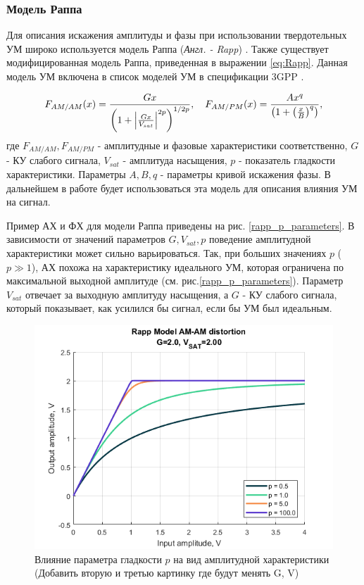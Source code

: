 \subsubsection{Модель Раппа}
Для описания искажения амплитуды и фазы при использовании твердотельных УМ
широко используется модель Раппа (\textit{Англ. - Rapp}) \cite{Rapp1991}.
Также существует модифицированная модель Раппа, приведенная в выражении
\ref{eq:Rapp}. Данная модель УМ включена в список моделей УМ в спецификации
3GPP \cite{3gpp.38.803}.

\begin{equation}
    F_{AM/AM}(x) = \frac{G x}{\left( 1 + \abs{\frac{Gx}{V_{sat}}}^{2p}\right)^{1/2p}},
    \quad 
    F_{AM/PM}(x) = \frac{Ax^q}{\left(1+\left(\frac{x}{B}\right)^q\right)},
    \label{eq:Rapp}
\end{equation}
где $F_{AM/AM}, F_{AM/PM}$ - амплитудные и фазовые характеристики
соответственно, $G$ - КУ слабого сигнала, $V_{sat}$ - амплитуда насыщения,
$p$ - показатель гладкости характеристики. Параметры $A,B,q$ - параметры
кривой искажения фазы. В дальнейшем в работе будет использоваться эта
модель для описания влияния УМ на сигнал.

Пример АХ и ФХ для модели Раппа приведены на  рис. \ref{rapp_p_parameters}.
В зависимости от значений параметров $G, V_{sat}, p$ поведение амплитудной
характеристики может сильно варьироваться. Так, при больших значениях $p$
($p\gg 1$), АХ похожа на характеристику идеального УМ, которая ограничена
по максимальной выходной амплитуде (см. рис.\ref{rapp_p_parameters}).
Параметр $V_{sat}$ отвечает за выходную амплитуду насыщения, а $G$ - КУ
слабого сигнала, который показывает, как усилился бы сигнал, если бы УМ был 
идеальным.
\begin{figure}[h!]
    \centering
    \includegraphics[width=0.7\linewidth]{figs/rapp_p.png}
    \caption{Влияние параметра гладкости $p$ на вид амплитудной
    характеристики (Добавить вторую и третью картинку где будут менять G, V)}
    \label{fig:rapp_p_parameters}
\end{figure}

